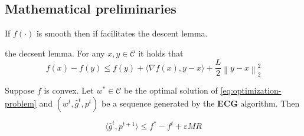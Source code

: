 \documentclass[runningheads, draft]{llncs}
\newcommand{\norm}[1]{\left\lVert#1\right\rVert}
\newcommand{\vprod}[1]{\langle#1\rangle}
\newcommand{\errgrad}{\hat{g}}
\begin{document}
\subsection{Mathematical preliminaries}
%
If $f(\cdot)$ is smooth then if facilitates the descent lemma.
%
\begin{lemma}{the decsent lemma}. For any $x, y \in \mathcal{C}$ it holds that
    \begin{equation}\label{lemma:descent-lemma}
        f(x) - f(y) \leqslant f(y) + \vprod{\nabla f(x), y - x} +
        \frac{L}{2} \norm{y - x}^2_2
    \end{equation}
\end{lemma}
%
\begin{lemma}Suppose $f$ is convex. Let $w^* \in \mathcal{C}$ be the optimal
    solution of \eqref{eq:optimization-problem} and ${(w^t, \errgrad^t, p^t)}$
    be a sequence generated by the \textbf{ECG} algorithm. Then

    \begin{equation}\label{eq:erroneous-gradient-props}
        \vprod{\errgrad^t, p^{t+1}} \leqslant f^* - f^t + \varepsilon M R
    \end{equation}
\end{lemma}
%
\end{document}

